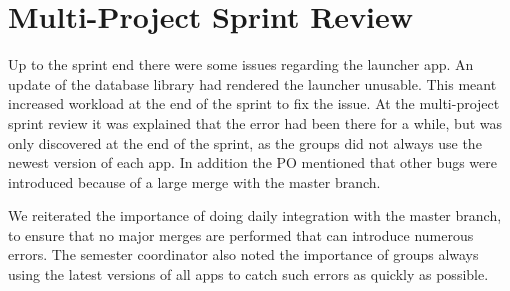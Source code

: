 \section{Multi-Project Sprint Review}\label{sec:s3_multiprj_review}
Up to the sprint end there were some issues regarding the launcher app. An update of the database library had rendered the launcher unusable. This meant increased workload at the end of the sprint to fix the issue. At the multi-project sprint review it was explained that the error had been there for a while, but was only discovered at the end of the sprint, as the \gui groups did not always use the newest version of each app. In addition the \db PO mentioned that other bugs were introduced because of a large merge with the master branch.

We reiterated the importance of doing daily integration with the master branch, to ensure that no major merges are performed that can introduce numerous errors. The semester coordinator also noted the importance of \gui groups always using the latest versions of all apps to catch such errors as quickly as possible.
